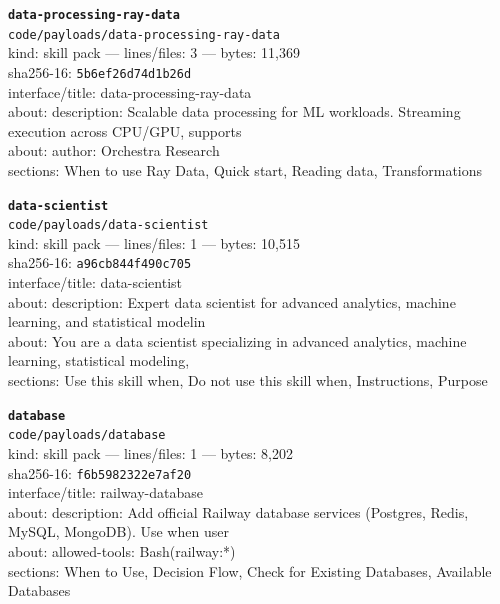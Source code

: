 \noindent\textbf{\texttt{data-processing-ray-data}}\\
\texttt{code/payloads/data-processing-ray-data}\\
kind: skill pack --- lines/files: 3 --- bytes: 11,369\\
sha256-16: \texttt{5b6ef26d74d1b26d}\\
interface/title: data-processing-ray-data\\
about: description: Scalable data processing for ML workloads. Streaming execution across CPU/GPU, supports\\
about: author: Orchestra Research\\
sections: When to use Ray Data, Quick start, Reading data, Transformations\\
\vspace*{6.0pt}

\noindent\textbf{\texttt{data-scientist}}\\
\texttt{code/payloads/data-scientist}\\
kind: skill pack --- lines/files: 1 --- bytes: 10,515\\
sha256-16: \texttt{a96cb844f490c705}\\
interface/title: data-scientist\\
about: description: Expert data scientist for advanced analytics, machine learning, and statistical modelin\\
about: You are a data scientist specializing in advanced analytics, machine learning, statistical modeling,\\
sections: Use this skill when, Do not use this skill when, Instructions, Purpose\\
\vspace*{6.0pt}

\noindent\textbf{\texttt{database}}\\
\texttt{code/payloads/database}\\
kind: skill pack --- lines/files: 1 --- bytes: 8,202\\
sha256-16: \texttt{f6b5982322e7af20}\\
interface/title: railway-database\\
about: description: Add official Railway database services (Postgres, Redis, MySQL, MongoDB). Use when user\\
about: allowed-tools: Bash(railway:*)\\
sections: When to Use, Decision Flow, Check for Existing Databases, Available Databases\\
\vspace*{6.0pt}
\newpage

